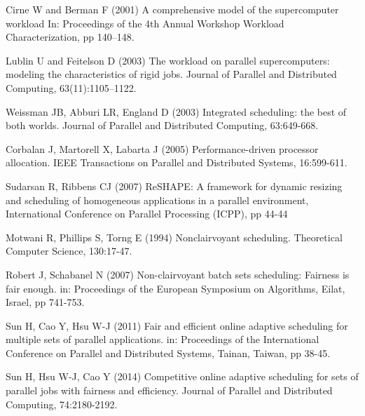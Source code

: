 \documentclass[10pt, a4paper]{article}
\begin{document}
\begin{thebibliography}{10}
Cirne W and Berman F (2001) A comprehensive model of the supercomputer workload In: Proceedings of
the 4th Annual Workshop Workload Characterization, pp 140--148.

Lublin U and Feitelson D (2003) The workload on parallel supercomputers: modeling the
characteristics of rigid jobs. Journal of Parallel and Distributed Computing, 63(11):1105--1122.

Weissman JB, Abburi LR, England D (2003) Integrated scheduling: the best of both worlds. Journal of
Parallel and Distributed Computing, 63:649-668.

Corbalan J, Martorell X, Labarta J (2005) Performance-driven processor
  allocation. IEEE Transactions on Parallel and Distributed Systems, 16:599-611.

Sudarsan R, Ribbens CJ (2007) ReSHAPE: A framework for dynamic resizing and scheduling of
homogeneous applications in a parallel environment, International Conference on Parallel Processing
(ICPP), pp 44-44

Motwani R, Phillips S, Torng E (1994) Nonclairvoyant scheduling. Theoretical Computer Science,
130:17-47.

Robert J, Schabanel N (2007) Non-clairvoyant batch sets scheduling: Fairness
  is fair enough. in: Proceedings of the European Symposium on Algorithms, Eilat, Israel, pp 741-753.

Sun H, Cao Y, Hsu W-J (2011) Fair and efficient online adaptive scheduling for multiple sets of
parallel applications. in: Proceedings of the International Conference on Parallel and Distributed
Systems, Tainan, Taiwan, pp 38-45.

Sun H, Hsu W-J, Cao Y (2014) Competitive online adaptive scheduling for sets of parallel jobs with fairness and efficiency. Journal of Parallel and Distributed Computing, 74:2180-2192. 
\end{thebibliography}
\end{document}
